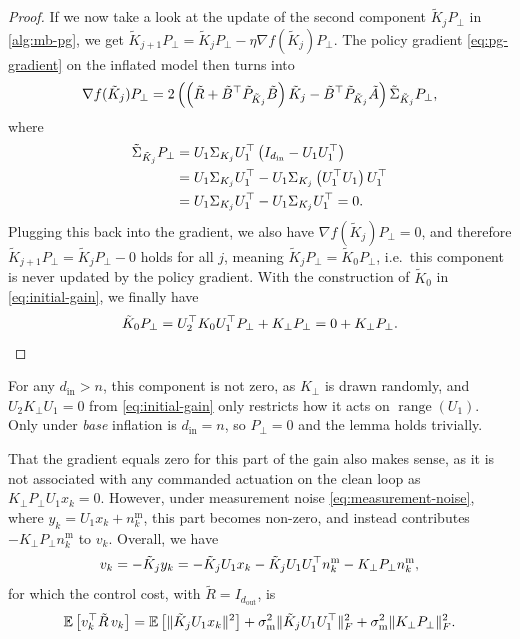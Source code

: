 \begin{proof}
If we now take a look at the update of the second component $\tilde{K}_j P_{\perp}$ in \cref{alg:mb-pg}, we get
$\tilde{K}_{j+1} P_{\perp} = \tilde{K}_j P_{\perp} - \eta \nabla f(\tilde{K}_j) P_{\perp}$. The policy gradient
\eqref{eq:pg-gradient} on the inflated model then turns into
\begin{equation*}
    \nabla f(\tilde{K}_j) P_{\perp}
    = 2 \left( \left( \tilde{R} + \tilde{B}^{\top} \tilde{P}_{\tilde{K}_j} \tilde{B} \right) \tilde{K}_j
    - \tilde{B}^{\top} \tilde{P}_{\tilde{K}_j} \tilde{A} \right) \tilde{\Sigma}_{\tilde{K}_j} P_{\perp} ,
\end{equation*}
where
\begin{align*}
    \tilde{\Sigma}_{\tilde{K}_j} P_{\perp}
    &= U_1 \Sigma_{K_j} U_1^{\top} \left( I_{d_{\mathrm{in}}} - U_1 U_1^{\top} \right) \\
    &= U_1 \Sigma_{K_j} U_1^{\top} - U_1 \Sigma_{K_j} \left( U_1^{\top} U_1 \right) U_1^{\top} \\
    &= U_1 \Sigma_{K_j} U_1^{\top} - U_1 \Sigma_{K_j} U_1^{\top} = 0 .
\end{align*}
Plugging this back into the gradient, we also have $\nabla f(\tilde{K}_j) P_{\perp} = 0$, and therefore
$\tilde{K}_{j+1} P_{\perp} = \tilde{K}_j P_{\perp} - 0$ holds for all $j$, meaning $\tilde{K}_j P_{\perp} = \tilde{K}_0 P_{\perp}$,
i.e.\ this component is never updated by the policy gradient. With the construction of $\tilde{K}_0$ in \eqref{eq:initial-gain},
we finally have
\begin{equation*}
    \tilde{K}_0 P_{\perp} = U_2^{\top} K_0 U_1^{\top} P_{\perp} + K_{\perp} P_{\perp} = 0 + K_{\perp} P_{\perp} .
    \qedhere
\end{equation*}
\end{proof}

For any $d_{\mathrm{in}} > n$, this component is not zero, as $K_{\perp}$ is drawn randomly, and $U_2 K_{\perp} U_1 = 0$
from \eqref{eq:initial-gain} only restricts how it acts on $\operatorname{range}(U_1)$. Only under
\emph{base} inflation is $d_{\mathrm{in}} = n$, so $P_{\perp} = 0$ and the lemma holds trivially.

That the gradient equals zero for this part of the gain also makes sense, as it is not associated with any commanded
actuation on the clean loop as $K_{\perp} P_{\perp} U_1 x_k = 0$. However, under measurement noise \eqref{eq:measurement-noise},
where $y_k = U_1 x_k + n^{\mathrm{m}}_k$, this part becomes non-zero, and instead contributes
$-K_{\perp} P_{\perp} n^{\mathrm{m}}_k$ to $v_k$. Overall, we have
\begin{equation}
    \label{eq:app-noisy-input}
    v_k = -\tilde{K}_j y_k = -\tilde{K}_j U_1 x_k - \tilde{K}_j U_1 U_1^{\top} n^{\mathrm{m}}_k - K_{\perp} P_{\perp} n^{\mathrm{m}}_k ,
\end{equation}
for which the control cost, with $\tilde{R} = I_{d_{\mathrm{out}}}$, is
\begin{equation}
    \label{eq:app-noisy-control-cost}
    \mathbb{E} \left[ v_k^{\top} \tilde{R}\, v_k \right]
    = \mathbb{E} \left[ \lVert \tilde{K}_j U_1 x_k \rVert^2 \right]
    + \sigma_{\mathrm{m}}^{2} \lVert \tilde{K}_j U_1 U_1^{\top} \rVert_F^2
    + \sigma_{\mathrm{m}}^{2} \lVert K_{\perp} P_{\perp} \rVert_F^2 .
\end{equation}

